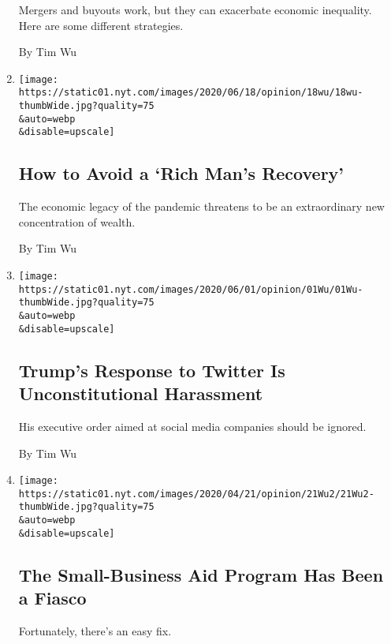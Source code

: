 \begin{enumerate}
  Mergers and buyouts work, but they can exacerbate economic inequality.
  Here are some different strategies.

  By Tim Wu
\item
  \href{/2020/06/18/opinion/covid-economic-recovery-inequality.html}{}

  \texttt{[image: https://static01.nyt.com/images/2020/06/18/opinion/18wu/18wu-thumbWide.jpg?quality=75\\\&auto=webp\\\&disable=upscale]}

  \hypertarget{how-to-avoid-a-rich-mans-recovery}{%
  \subsection{How to Avoid a `Rich Man's
  Recovery'}\label{how-to-avoid-a-rich-mans-recovery}}

  The economic legacy of the pandemic threatens to be an extraordinary
  new concentration of wealth.

  By Tim Wu
\item
  \href{/2020/06/02/opinion/trump-twitter-executive-order.html}{}

  \texttt{[image: https://static01.nyt.com/images/2020/06/01/opinion/01Wu/01Wu-thumbWide.jpg?quality=75\\\&auto=webp\\\&disable=upscale]}

  \hypertarget{trumps-response-to-twitter-is-unconstitutional-harassment}{%
  \subsection{Trump's Response to Twitter Is Unconstitutional
  Harassment}\label{trumps-response-to-twitter-is-unconstitutional-harassment}}

  His executive order aimed at social media companies should be ignored.

  By Tim Wu
\item
  \href{/2020/04/21/opinion/paycheck-protection-program.html}{}

  \texttt{[image: https://static01.nyt.com/images/2020/04/21/opinion/21Wu2/21Wu2-thumbWide.jpg?quality=75\\\&auto=webp\\\&disable=upscale]}

  \hypertarget{the-small-business-aid-program-has-been-a-fiasco}{%
  \subsection{The Small-Business Aid Program Has Been a
  Fiasco}\label{the-small-business-aid-program-has-been-a-fiasco}}

  Fortunately, there's an easy fix.


\end{enumerate}
